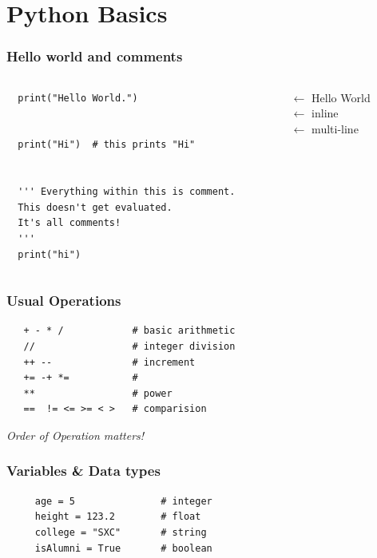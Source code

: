 \documentclass[12pt, aspectratio=169]{beamer}
\begin{document}
\section{Python Basics}
\begin{frame}[fragile]
  \frametitle{Hello world and comments}
  \begin{columns}
  \hspace{-2em}\begin{column}{5cm}
  \begin{verbatim}
  print("Hello World.")

  
  print("Hi")  # this prints "Hi" 

  
  ''' Everything within this is comment.
  This doesn't get evaluated.
  It's all comments!
  '''
  print("hi")
  \end{verbatim}
  \end{column}
  \begin{column}{5cm}
   \hspace{5em} $\leftarrow$    Hello World \\ 
    \vspace{2em}
    \hspace{5em}$\leftarrow$    inline  \\
    \vspace{3em}
    \hspace{5em}$\leftarrow$    multi-line \\ 
    \vspace{4em}
  \end{column}
 \end{columns}
 
\end{frame}

\begin{frame} [fragile]
  \frametitle{Usual Operations}
  \begin{verbatim}
   + - * /            # basic arithmetic 
   //                 # integer division
   ++ --              # increment
   += -+ *=           # 
   **                 # power
   ==  != <= >= < >   # comparision
 \end{verbatim}
\vspace{2em}
\emph{Order of Operation matters!}
\end{frame}

\begin{frame} [fragile]
  \frametitle{Variables \& Data types}
\begin{verbatim}
     age = 5               # integer
     height = 123.2        # float
     college = "SXC"       # string
     isAlumni = True       # boolean

\end{verbatim}
\end{frame}
\end{document}
